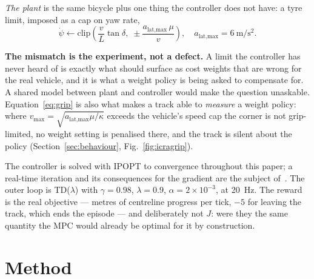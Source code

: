 \documentclass[letterpaper, 10 pt, conference]{ieeeconf}
\begin{document}
\emph{The plant} is the same bicycle plus one thing the controller does not
have: a tyre limit, imposed as a cap on yaw rate,
\begin{equation}
  \dot\psi \leftarrow \mathrm{clip}\!\left(\frac{v}{L}\tan\delta,\;
  \pm\frac{a_{\text{lat,max}}\,\mu}{v}\right),
  \quad a_{\text{lat,max}} = \SI{6}{\meter\per\second\squared}.
  \label{eq:grip}
\end{equation}

\textbf{The mismatch is the experiment, not a defect.} A limit the controller
has never heard of is exactly what should surface as cost weights that are
wrong for the real vehicle, and it is what a weight policy is being asked to
compensate for. A shared model between plant and controller would make the
question unaskable. Equation~\eqref{eq:grip} is also what makes a track able to
\emph{measure} a weight policy: where $v_{\max}=\sqrt{a_{\text{lat,max}}\mu/
\kappa}$ exceeds the vehicle's speed cap the corner is not grip-limited, no
weight setting is penalised there, and the track is silent about the policy
(Section~\ref{sec:behaviour}, Fig.~\ref{fig:icragrip}).

The controller is solved with IPOPT to convergence throughout this paper; a
real-time iteration and its consequences for the gradient are the subject
of~\cite{paper1}. The outer loop is TD($\lambda$) with $\gamma = 0.98$,
$\lambda = 0.9$, $\alpha = 2\times10^{-3}$, at \SI{20}{\hertz}. The reward is
the real objective --- metres of centreline progress per tick, $-5$ for leaving
the track, which ends the episode --- and deliberately not $J$: were they the
same quantity the MPC would already be optimal for it by construction.

\section{Method}\label{sec:method}
\end{document}
